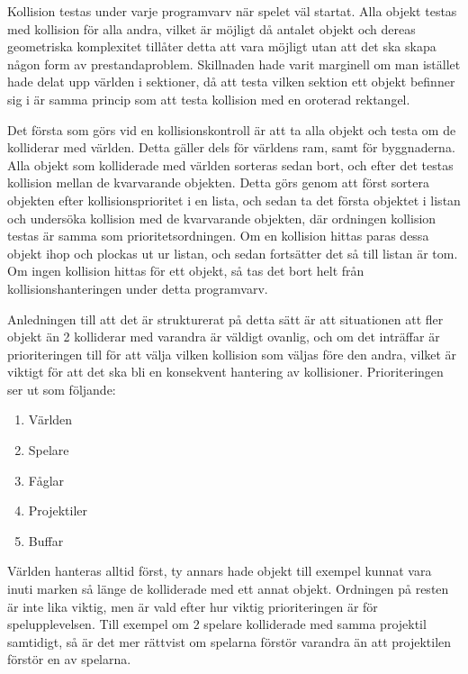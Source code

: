 \documentclass[12pt,a4paper]{article}
\newcounter{subsubsubsection}[subsubsection]
\begin{document}
Kollision testas under varje programvarv när spelet väl startat. Alla objekt testas med kollision för alla andra, vilket är möjligt då antalet objekt och dereas geometriska komplexitet tillåter detta att vara möjligt utan att det ska skapa någon form av prestandaproblem. Skillnaden hade varit marginell om man istället hade delat upp världen i sektioner, då att testa vilken sektion ett objekt befinner sig i är samma princip som att testa kollision med en oroterad rektangel. 

\vspace{0.2cm}

Det första som görs vid en kollisionskontroll är att ta alla objekt och testa om de kolliderar med världen. Detta gäller dels för världens ram, samt för byggnaderna. Alla objekt som kolliderade med världen sorteras sedan bort, och efter det testas kollision mellan de kvarvarande objekten. Detta görs genom att först sortera objekten efter kollisionsprioritet i en lista, och sedan ta det första objektet i listan och undersöka kollision med de kvarvarande objekten, där ordningen kollision testas är samma som prioritetsordningen. Om en kollision hittas paras dessa objekt ihop och plockas ut ur listan, och sedan fortsätter det så till listan är tom. Om ingen kollision hittas för ett objekt, så tas det bort helt från kollisionshanteringen under detta programvarv.

\vspace{0.2cm}
 
Anledningen till att det är strukturerat på detta sätt är att situationen att fler objekt än 2 kolliderar med varandra är väldigt ovanlig, och om det inträffar är prioriteringen till för att välja vilken kollision som väljas före den andra, vilket är viktigt för att det ska bli en konsekvent hantering av kollisioner. Prioriteringen ser ut som följande:

\begin{enumerate}
	\item Världen
	
	\item Spelare
	
	\item Fåglar
	
	\item Projektiler
	
	\item Buffar	
\end{enumerate}

Världen hanteras alltid först, ty annars hade objekt till exempel kunnat vara inuti marken så länge de kolliderade med ett annat objekt. Ordningen på resten är inte lika viktig, men är vald efter hur viktig prioriteringen är för spelupplevelsen. Till exempel om 2 spelare kolliderade med samma projektil samtidigt, så är det mer rättvist om spelarna förstör varandra än att projektilen förstör en av spelarna.
\end{document}

